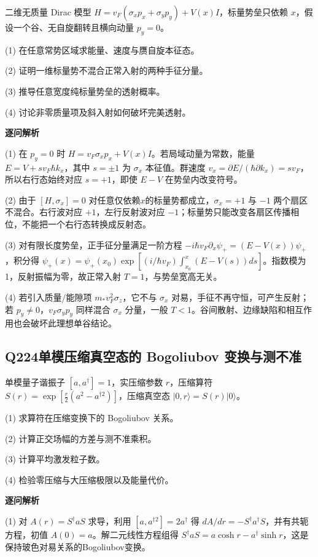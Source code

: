 二维无质量 Dirac 模型 $H=v_F(\sigma_xp_x+\sigma_yp_y)+V(x)I$，标量势垒只依赖 $x$，假设一个谷、无自旋翻转且横向动量 $p_y=0$。

(1) 在任意常势区域求能量、速度与赝自旋本征态。

(2) 证明一维标量势不混合正常入射的两种手征分量。

(3) 推导任意宽度纯标量势垒的透射概率。

(4) 讨论非零质量项及斜入射如何破坏完美透射。

\par\textbf{逐问解析}

(1) 在 $p_y=0$ 时 $H=v_F\sigma_xp_x+V(x)I$。若局域动量为常数，能量 $E=V+s v_F\hbar k_x$，其中 $s=\pm1$ 为 $\sigma_x$ 本征值。群速度 $v_x=\partial E/(\hbar\partial k_x)=s v_F$，所以右行态始终对应 $s=+1$，即使 $E-V$ 在势垒内改变符号。

(2) 由于 $[H,\sigma_x]=0$ 对任意仅依赖$x$的标量势都成立，$\sigma_x=+1$ 与 $-1$ 两个扇区不混合。右行波对应 $+1$，左行反射波对应 $-1$；标量势只能改变各扇区传播相位，不能把一个右行态转换成反射态。

(3) 对有限长度势垒，正手征分量满足一阶方程 $-i\hbar v_F\partial_x\psi_+=(E-V(x))\psi_+$，积分得 $\psi_+(x)=\psi_+(x_0)\exp[(i/\hbar v_F)\int_{x_0}^x(E-V(s))ds]$。指数模为1，反射振幅为零，故正常入射 $T=1$，与势垒宽高无关。

(4) 若引入质量/能隙项 $m_*v_F^2\sigma_z$，它不与 $\sigma_x$ 对易，手征不再守恒，可产生反射；若 $p_y\ne0$，$v_F\sigma_yp_y$ 同样混合 $\sigma_x$ 分量，一般 $T<1$。谷间散射、边缘缺陷和相互作用也会破坏此理想单谷结论。

\par\medskip

\subsection*{Q224\quad 单模压缩真空态的 Bogoliubov 变换与测不准}

单模量子谐振子 $[a,a^\dagger]=1$，实压缩参数 $r$，压缩算符 $S(r)=\exp[\tfrac r2(a^2-a^{\dagger2})]$，压缩真空态 $|0,r\rangle=S(r)|0\rangle$。

(1) 求算符在压缩变换下的 Bogoliubov 关系。

(2) 计算正交场幅的方差与测不准乘积。

(3) 计算平均激发粒子数。

(4) 检验零压缩与大压缩极限以及能量代价。

\par\textbf{逐问解析}

(1) 对 $A(r)=S^\dagger aS$ 求导，利用 $[a,a^{\dagger2}]=2a^\dagger$ 得 $dA/dr=-S^\dagger a^\dagger S$，并有共轭方程，初值 $A(0)=a$。解二元线性方程组得 $S^\dagger a S=a\cosh r-a^\dagger\sinh r$，这是保持玻色对易关系的Bogoliubov变换。

